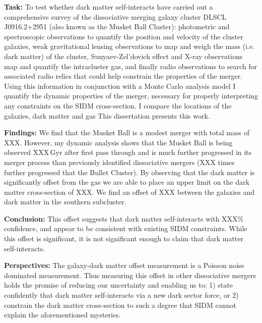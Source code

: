 \noindent\textbf{Task:} 
To test whether dark matter self-interacts  have carried out a comprehensive survey of the dissociative merging galaxy cluster DLSCL J0916.2+2951 (also known as the Musket Ball Cluster):
photometric and spectroscopic observations to quantify the position and velocity of the cluster galaxies,
weak gravitational lensing observations to map and weigh the mass (i.e. dark matter) of the cluster,
Sunyaev-Zel'dovich effect and X-ray observations map and quantify the intracluster gas,
and finally radio observations to search for associated radio relics that could help constrain the properties of the merger.
Using this information in conjunction with a Monte Carlo analysis model I quantify the dynamic properties of the merger, necessary for properly interpreting any constraints on the SIDM cross-section.
I compare the locations of the galaxies, dark matter and gas
This dissertation presents this work.

\noindent\textbf{Findings:} 
We find that the Musket Ball is a modest merger with total mass of XXX.
However, my dynamic analysis shows that the Musket Ball is being observed XXX\,Gyr after first pass through and is much further progressed in its merger process than previously identified dissociative mergers (XXX times further progressed that the Bullet Cluster). 
By observing that the dark matter is significantly offset from the gas we are able to place an upper limit on the dark matter cross-section of XXX.
We find an offset of XXX between the galaxies and dark matter in the southern subcluster.

\noindent\textbf{Conclusion:}
This offset suggests that dark matter self-interacts with XXX\% confidence, and appear to be consistent with existing SIDM constraints.
While this offset is significant, it is not significant enough to claim that dark matter self-interacts.

\noindent\textbf{Perspectives:}
The galaxy-dark matter offset measurement is a Poisson noise dominated measurement.
Thus measuring this offset in other dissociative mergers holds the promise of reducing our uncertainty and enabling us to: 1) state confidently that dark matter self-interacts via a new dark sector force, or 2) constrain the dark matter cross-section to such a degree that SIDM cannot explain the aforementioned mysteries.
